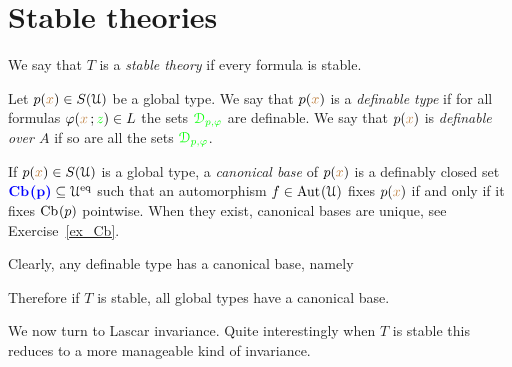 \documentclass[creche.tex]{subfiles}
\begin{document}
\section{Stable theories}
\label{stable_teories}

We say that $T$ is a \emph{stable theory\/} if every formula is stable.

Let $p({\color{brown} x})\in S(\EuScript U)$ be a global type. We say that $p({\color{brown} x})$ is a \emph{definable type\/} if  for all formulas $\varphi({\color{brown} x}\,;{\color{green} z})\in L$ the sets ${\color{green}\EuScript D_{p,\varphi}}$ are definable. We say that $p({\color{brown} x})$ is  \emph{definable over $A$} if so are all the sets ${\color{green}\EuScript D_{p,\varphi}}$. 

If $p({\color{brown} x})\in S(\EuScript U)$ is a global type, a \emph{canonical base\/} of $p({\color{brown} x})$ is a definably closed set $\textcolor{blue}{\textbf{\boldmath \textrm{Cb\kern.15ex}(p)}}\subseteq \EuScript U^{{\rm eq}}$ such that an automorphism $f\in\textrm{Aut\kern.15ex}(\EuScript U)$ fixes $p({\color{brown} x})$ if and only if it fixes $\textrm{Cb\kern.15ex}(p)$ pointwise. When they exist, canonical bases are unique, see Exercise~\ref{ex_Cb}.

Clearly, any definable type has a canonical base, namely


Therefore if $T$ is stable, all global types have a canonical base.

We now turn to Lascar invariance. Quite interestingly when $T$ is stable this reduces to a more manageable kind of invariance.
\end{document}
